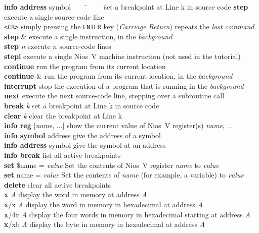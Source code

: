 \documentclass[11pt, twoside, pdftex]{article}
\begin{document}
\begin{tabbing}
{\bf info address} symbol ~~~~\= ~~~~\=set a breakpoint at Line k in source code\kill
{\bf step} \>execute a single source-code line\\
{\texttt{<CR>}} \>simply pressing the \texttt{ENTER} key ({\it Carriage Return}) repeats the {\it last command}\\
{\bf step} \& \>execute a single instruction, in the {\it background}\\
{\bf step} {\it n} \>execute $n$ source-code lines\\
{\bf stepi} \>execute a single Nios~V machine instruction (not used in the tutorial)\\
{\bf continue} \>run the program from its current location\\
{\bf continue} \& \>run the program from its current location, in the {\it background}\\
{\bf interrupt} \>stop the execution of a program that is running in the {\it background}\\
{\bf next} \>execute the next source-code line, stepping over a subroutine call\\
{\bf break} {\it k} \>set a breakpoint at Line k in source code\\
{\bf clear} {\it k} \>clear the breakpoint at Line k \\
{\bf info reg} [{\it name}, $\ldots$] \>show the current value of Nios~V register(s) {\it
name}, $\ldots$\\
{\bf info symbol} address \>give the address of a symbol\\
{\bf info address} symbol \>give the symbol at an address\\
{\bf info break} \>list all active breakpoints\\
{\bf set} \$name = {\it value} \>Set the contents of Nios~V register {\it name} to {\it value}\\
{\bf set} name = {\it value} \>Set the contents of {\it name} (for example, a variable) to {\it value}\\
{\bf delete} \>clear all active breakpoints\\
{\bf x} {\it A} \>display the word in memory at address {\it A}\\
{\bf x}/x {\it A} \>display the word in memory in hexadecimal at address {\it A}\\
{\bf x}/4x {\it A} \>display the four words in memory in hexadecimal starting at address {\it A}\\
{\bf x}/xb {\it A} \>display the byte in memory in hexadecimal at address {\it A}\\

\end{tabbing}
\end{document}
